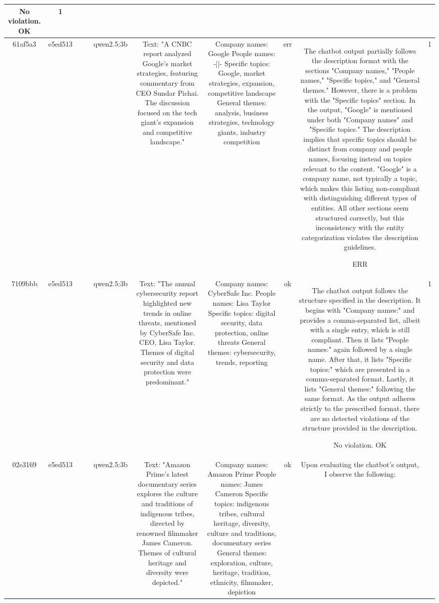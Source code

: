 \begin{table}[h!]
\begin{tabular}{|c|c|c|c|c|c|c|c|c|c|}
No violation.
OK & 1\\
\hline
61af5a3 & e5ed513 &  &  & qwen2.5:3b & Text: "A CNBC report analyzed Google's market strategies, featuring commentary from CEO Sundar Pichai. The discussion focused on the tech giant's expansion and competitive landscape." & Company names: Google
People names: -||-
Specific topics: Google, market strategies, expansion, competitive landscape
General themes: analysis, business strategies, technology giants, industry competition & err & The chatbot output partially follows the description format with the sections "Company names," "People names," "Specific topics," and "General themes." However, there is a problem with the "Specific topics" section. In the output, "Google" is mentioned under both "Company names" and "Specific topics." The description implies that specific topics should be distinct from company and people names, focusing instead on topics relevant to the content. "Google" is a company name, not typically a topic, which makes this listing non-compliant with distinguishing different types of entities. All other sections seem structured correctly, but this inconsistency with the entity categorization violates the description guidelines.

ERR & 1\\
\hline
7109bbb & e5ed513 &  &  & qwen2.5:3b & Text: "The annual cybersecurity report highlighted new trends in online threats, mentioned by CyberSafe Inc. CEO, Lisa Taylor. Themes of digital security and data protection were predominant." & Company names: CyberSafe Inc.
People names: Lisa Taylor
Specific topics: digital security, data protection, online threats
General themes: cybersecurity, trends, reporting & ok & The chatbot output follows the structure specified in the description. It begins with "Company names:" and provides a comma-separated list, albeit with a single entry, which is still compliant. Then it lists "People names:" again followed by a single name. After that, it lists "Specific topics:" which are presented in a comma-separated format. Lastly, it lists "General themes:" following the same format. As the output adheres strictly to the prescribed format, there are no detected violations of the structure provided in the description.

No violation.
OK & 1\\
\hline
02e3169 & e5ed513 &  &  & qwen2.5:3b & Text: "Amazon Prime's latest documentary series explores the culture and traditions of indigenous tribes, directed by renowned filmmaker James Cameron. Themes of cultural heritage and diversity were depicted." & Company names: Amazon Prime
People names: James Cameron
Specific topics: indigenous tribes, cultural heritage, diversity, culture and traditions, documentary series
General themes: exploration, culture, heritage, tradition, ethnicity, filmmaker, depiction & ok & Upon evaluating the chatbot's output, I observe the following:


\end{tabular}
\end{table}
